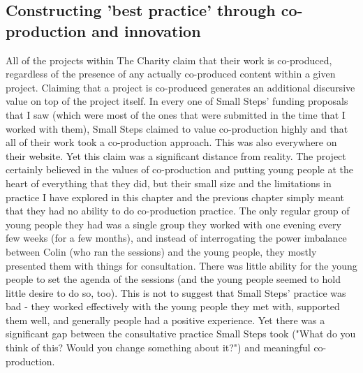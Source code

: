 \subsection{Constructing 'best practice' through co-production and innovation}
All of the projects within The Charity claim that their work is co-produced, regardless of the presence of any actually co-produced content within a given project. Claiming that a project is co-produced generates an additional discursive value on top of the project itself. In every one of Small Steps' funding proposals that I saw (which were most of the ones that were submitted in the time that I worked with them), Small Steps claimed to value co-production highly and that all of their work took a co-production approach. This was also everywhere on their website. Yet this claim was a significant distance from reality. The project certainly believed in the values of co-production and putting young people at the heart of everything that they did, but their small size and the limitations in practice I have explored in this chapter and the previous chapter simply meant that they had no ability to do co-production practice. The only regular group of young people they had was a single group they worked with one evening every few weeks (for a few months), and instead of interrogating the power imbalance between Colin (who ran the sessions) and the young people, they mostly presented them with things for consultation. There was little ability for the young people to set the agenda of the sessions (and the young people seemed to hold little desire to do so, too). This is not to suggest that Small Steps' practice was bad - they worked effectively with the young people they met with, supported them well, and generally people had a positive experience. Yet there was a significant gap between the consultative practice Small Steps took ("What do you think of this? Would you change something about it?") and meaningful co-production.

